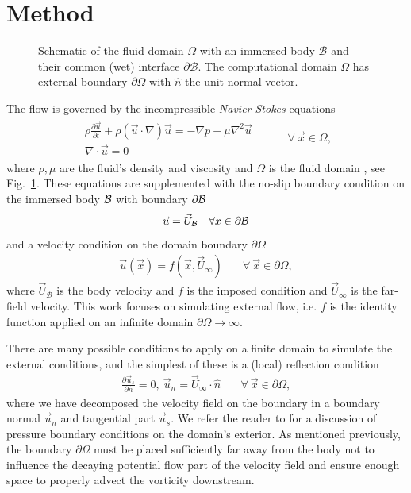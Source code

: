 \documentclass[final,1p,times]{elsarticle}
\begin{document}
\section{Method}

\begin{figure}
    \centering
    \def\svgwidth{0.5\columnwidth}
    
    \caption{Schematic of the fluid domain $\Omega$ with an immersed body $\mathcal{B}$ and their common (wet) interface $\partial\mathcal{B}$. The computational domain $\Omega$ has external boundary $\partial\Omega$ with $\hat{n}$ the unit normal vector.}
    \label{Fig_1}
\end{figure}

\noindent The flow is governed by the incompressible \emph{Navier-Stokes} equations
\begin{align}
    \begin{array}{c}
     \rho\frac{\partial\vec{u}}{\partial t} +\rho\left(\vec{u}\cdot\nabla\right)\vec{u} = -\nabla p + \mu\nabla^2\vec{u}\\
    \nabla\cdot\vec{u}=0  
    \end{array}
 & \quad\quad\forall\ \vec{x}\in\Omega,
\end{align}
where $\rho,\mu$ are the fluid's density and viscosity and $\Omega$ is the fluid domain , see Fig.~\ref{Fig_1}. These equations are supplemented with the no-slip boundary condition on the immersed body $\cal B$ with boundary $\partial\cal{B}$
\begin{equation}
    \vec{u} = \vec{U}_\mathcal{B} \quad \forall x \in \partial\cal{B}
\end{equation} 
and a velocity condition on the domain boundary $\partial\Omega$
\begin{align}
    \vec u(\vec x) = f(\vec x,\vec U_\infty) &\quad\forall\ \vec{x}\in\partial\Omega,
\end{align}
where $\vec{U}_\mathcal{B}$ is the body velocity and $f$ is the imposed condition and $\vec U_\infty$ is the far-field velocity. This work focuses on simulating external flow, i.e. $f$ is the identity function applied on an infinite domain $\partial\Omega\rightarrow\infty$.

There are many possible conditions to apply on a finite domain to simulate the external conditions, and the simplest of these is a (local) reflection condition
\begin{align}\label{eq:BC_0}
    \frac{\partial \vec{u}_s}{\partial \hat{n}} = 0,\ \vec{u}_n = \vec U_\infty\cdot \hat n &\quad\forall\ \vec{x}\in\partial\Omega,
\end{align}
where we have decomposed the velocity field on the boundary in a boundary normal $\vec{u}_n$ and tangential part $\vec{u}_s$. We refer the reader to \cite{Gresho1987} for a discussion of pressure boundary conditions on the domain's exterior.  As mentioned previously, the boundary $\partial\Omega$ must be placed sufficiently far away from the body not to influence the decaying potential flow part of the velocity field and ensure enough space to properly advect the vorticity downstream. 
\end{document}

